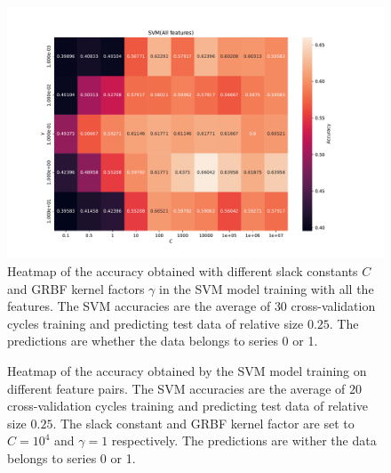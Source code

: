 \begin{figure}[H]
\centering
\includegraphics[width=1\textwidth]{Figures/accuracy(C,gamma)4}
\caption{Heatmap of the accuracy obtained with different slack constants $C$ and 
GRBF kernel factors $\gamma $ in the SVM model training with all the features. The SVM accuracies are the average of $30$ cross-validation 
cycles training and predicting test data of relative size $0.25$.
 The predictions are whether the data belongs to series 0 or 1.}
\label{fig:Figures-accuracy-C-gamma-4}
\end{figure}

\begin{figure}[H]
\centering
{}
\caption{Heatmap of the accuracy obtained by the SVM model training on different feature pairs. The SVM accuracies are the average 
of $20$ cross-validation cycles training and predicting test data of relative size $0.25$.
The slack constant and GRBF kernel factor are set to $C=10^4$ and $\gamma=1 $ respectively. 
 The predictions are wither the data belongs to series 0 or 1.}
\label{fig:Figures-feature_pairs4}
\end{figure}

